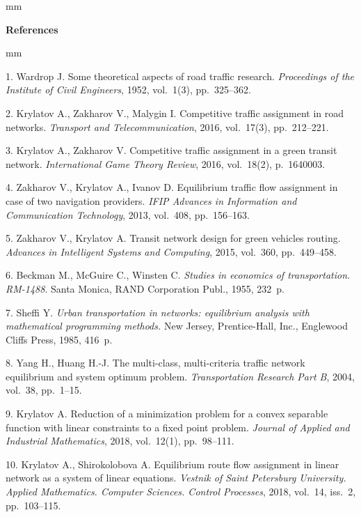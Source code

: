 

{\small



 mm

\noindent \textbf{References} }

 mm

{\footnotesize



1. Wardrop J.
Some theoretical aspects of road traffic research.
{\it Proceedings of the Institute of Civil Engineers}, 1952, vol.~1(3), pp.~325--362.

2. Krylatov A., Zakharov V., Malygin I.
Competitive traffic assignment in road networks.
{\it Transport and Telecommunication}, 2016, vol.~17(3), pp.~212--221.

3. Krylatov A., Zakharov V.
Competitive traffic assignment in a green transit network.
{\it International Game Theory Review}, 2016, vol.~18(2), p.~1640003.

4. Zakharov V., Krylatov A., Ivanov D.
Equilibrium traffic flow assignment in case of two navigation providers.
{\it IFIP Advances in Information and Communication Technology}, 2013, vol.~408, pp.~156--163.

5. Zakharov V., Krylatov A.
Transit network design for green vehicles routing.
{\it Advances in Intelligent Systems and Computing}, 2015, vol.~360, pp.~449--458.

6. Beckman M., McGuire C., Winsten C.
\textit{Studies in economics of transportation.
RM-1488}. Santa Monica, RAND Corporation Publ., 1955, 232~p.

7. Sheffi Y.
\textit{Urban transportation in networks: equilibrium analysis with mathematical program\-ming methods.}
New Jersey, Prentice-Hall, Inc., Englewood Cliffs Press, 1985, 416~p.

8. Yang H., Huang H.-J.
The multi-class, multi-criteria traffic network equilibrium and system optimum problem.
{\it Transportation Research Part B}, 2004, vol.~38, pp.~1--15.

9. Krylatov A.
Reduction of a minimization problem for a convex separable function with linear constraints to a fixed point problem.
{\it Journal of Applied and Industrial Mathematics}, 2018, vol.~12(1), pp.~98--111.

10. Krylatov A., Shirokolobova A.
Equilibrium route flow assignment in linear network as a system of linear equations.
{\it Vestnik of Saint Petersburg University. Applied Mathematics. Computer Sciences. Control Processes}, 2018, vol.~14, iss.~2, pp.~103--115.

}
